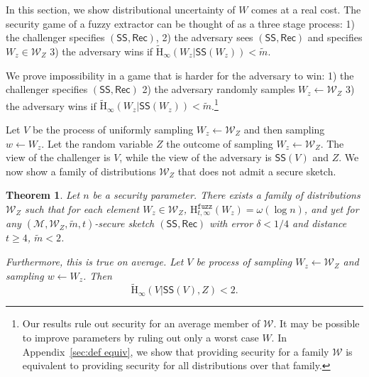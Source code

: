 \documentclass[11pt]{article}
\newtheorem{theorem}{Theorem}[section]
\newcommand{\apref}[1]{\mbox{Appendix~\ref{#1}}}
\newcommand{\class}[1]{{\ensuremath{\mathsf{#1}}}}
\newcommand{\sketch}{\ensuremath{\class{SS}}\xspace}
\newcommand{\rec}{\ensuremath{\class{Rec}}\xspace}
\newcommand{\Hav}{\tilde{\mathrm{H}}_\infty}
\newcommand{\Hfuzz}{\mathrm{H}^{\mathtt{fuzz}}_{t,\infty}}
\begin{document}
In this section, we show distributional uncertainty of $W$ comes at a real cost.  The security game of a fuzzy extractor can be thought of as a three stage process: 1) the challenger specifies $(\sketch, \rec)$, 2) the adversary sees $(\sketch, \rec)$ and specifies $W_z\in \mathcal{W}_Z$ 3) the adversary wins if $\Hav(W_z|\sketch(W_z))< \tilde{m}$.  

We prove impossibility in a game that is harder for the adversary to win: 1) the challenger specifies $(\sketch, \rec)$ 2) the adversary randomly samples $W_z\leftarrow \mathcal{W}_Z$ 3) the adversary wins if $\Hav(W_z|\sketch(W_z ) ) < \tilde{m}$.\footnote{Our results rule out security for an average member of $\mathcal{W}$.  It may be possible to improve parameters by ruling out only a worst case $W$.  In \apref{sec:def equiv}, we show that providing security for a family $\mathcal{W}$ is equivalent to providing security for all distributions over that family.}  

Let $V$ be the process of uniformly sampling $W_z\leftarrow \mathcal{W}_Z$ and then sampling $w\leftarrow W_z$.  Let the random variable $Z$ the outcome of sampling $W_z\leftarrow \mathcal{W}_Z$.  The view of the challenger is $V$, while the view of the adversary is $\sketch(V)$ and $Z$. 
We now show a family of distributions $\mathcal{W}_Z$ that does not admit a secure sketch.  

\begin{theorem}
\label{thm:imposs sketch}
Let $n$ be a security parameter.  There exists a family of distributions $\mathcal{W}_Z$ such that for each element $W_z\in \mathcal{W}_Z$, $\Hfuzz(W_z)= \omega(\log n)$, and yet for any $(\mathcal{M}, \mathcal{W}_Z, \tilde{m}, t)$-secure sketch $(\sketch, \rec)$ with error $\delta <1/4$ and distance $t\ge 4$, $\tilde{m}<2$.  

Furthermore, this is true on average.  Let $V$ be process of sampling $W_z\leftarrow \mathcal{W}_Z$ and sampling $w\leftarrow W_z$.  Then
\[
\Hav(V|\sketch(V), Z)< 2.
\]
\end{theorem}
\end{document}
